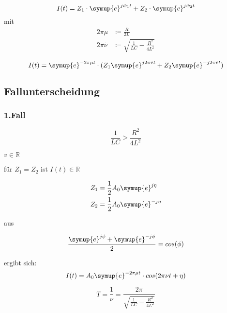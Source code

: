     \begin{equation}
        I(t) = Z_1 \cdot \symup{e}^{j \tilde{w}_1t} + Z_2 \cdot \symup{e}^{j\tilde{w}_2 t}
    \end{equation}
    mit 
    \begin{align}
        2 \pi \mu & \coloneq \frac{R}{2L} \\ 
        2 \pi \tilde{\nu} & \coloneq \sqrt{\frac{1}{LC} - \frac{R^2}{4L^2}}
    \end{align}

    \begin{equation}
        I(t) = \symup{e}^{- 2 \pi \mu t} \cdot  (Z_1 \symup{e}^{j 2\pi \tilde{v}t} + Z_2 \symup{e}^{-j 2\pi \tilde{v} t})
    \end{equation}

    \subsection{Fallunterscheidung}

        \subsubsection{1.Fall}

        \begin{equation}
            \frac{1}{LC} > \frac{R^2}{4L^2} 
        \end{equation}
        
        $v \in \mathds{R}$
       
        für $Z_1 = \overline{Z_2}$ ist $I(t) \in \mathds{R}$

        \begin{align}
            Z_1 & = \frac{1}{2} A_0 \symup{e}^{j \eta }\\
            Z_2 & = \frac{1}{2} A_0 \symup{e}^{-j \eta}
        \end{align}

        aus

        \begin{equation}
            \frac{\symup{e}^{j \phi} + \symup{e}^{-j \phi}}{2} = cos(\phi)
        \end{equation}

        ergibt sich:
        \begin{equation}
            I(t) = A_0 \symup{e}^{- 2 \pi \mu t} \cdot cos(2\pi \nu t + \eta)
        \end{equation}

        \begin{equation}
            T = \frac{1}{\nu} = \frac{2 \pi}{\sqrt{\frac{1}{LC}-\frac{R^2}{4L^2}}}
        \end{equation}

